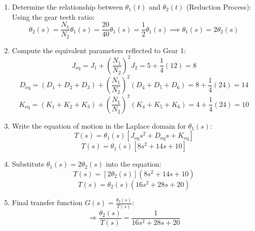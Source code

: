 \documentclass[11pt]{article}
\begin{document}
\begin{enumerate}[label=(\alph*), itemindent=*, leftmargin=*, nolistsep]
    \item Determine the relationship between $\theta_1(t)$ and $\theta_2(t)$ (Reduction Process):
    Using the gear teeth ratio:
    \[
    \theta_2(s) = \frac{N_1}{N_2} \theta_1(s) = \frac{20}{40} \theta_1(s) = \frac{1}{2} \theta_1(s) \implies \theta_1(s) = 2\theta_2(s)
    \]

    \item Compute the equivalent parameters reflected to Gear 1:
    \[
    J_{\text{eq}} = J_1 + \left(\frac{N_1}{N_2}\right)^2 J_2 = 5 + \frac{1}{4}(12) = 8
    \]
    \[
    D_{\text{eq}} = (D_1 + D_2 + D_3) + \left(\frac{N_1}{N_2}\right)^2 (D_4 + D_5 + D_6) = 8 + \frac{1}{4}(24) = 14
    \]
    \[
    K_{\text{eq}} = (K_1 + K_2 + K_3) + \left(\frac{N_1}{N_2}\right)^2 (K_4 + K_5 + K_6) = 4 + \frac{1}{4}(24) = 10
    \]

    \item Write the equation of motion in the Laplace domain for $\theta_1(s)$:
    \[
    T(s) = \theta_1(s) [ J_{\text{eq}} s^2 + D_{\text{eq}} s + K_{\text{eq}} ]
    \]
    \[
    T(s) = \theta_1(s) [ 8s^2 + 14s + 10 ]
    \]

    \item Substitute $\theta_1(s) = 2\theta_2(s)$ into the equation:
    \[
    T(s) = [2\theta_2(s)] (8s^2 + 14s + 10)
    \]
    \[
    T(s) = \theta_2(s) (16s^2 + 28s + 20)
    \]

    \item Final transfer function $G(s) = \frac{\theta_2(s)}{T(s)}$:
    \[
    \Rightarrow \boxed{ \frac{\theta_2(s)}{T(s)} = \frac{1}{16s^2 + 28s + 20}
    }
    \]
\end{enumerate}
\end{document}
